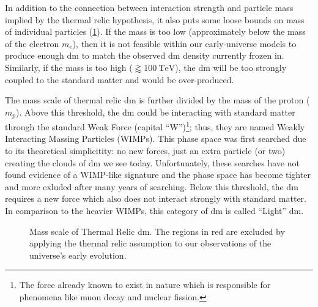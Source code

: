 In addition to the connection between interaction strength and particle mass implied by the thermal
relic hypothesis, it also puts some loose bounds on mass of individual particles
(\cref{fig:dm-mass-scale}). If the mass is too low (approximately below the mass of the electron
$m_e$), then it is not feasible within our early-universe models to produce enough \gls{dm} to
match the observed \gls{dm} density currently frozen in. Similarly, if the mass is too high
($\gtrapprox 100~\text{TeV}$), the \gls{dm} will be too strongly coupled to the standard matter and
would be over-produced. 

The mass scale of thermal relic \gls{dm} is further divided by the mass of the proton ($m_p$).
Above this threshold, the \gls{dm} could be interacting with standard matter through the standard
Weak Force (capital ``W'')\footnote{ The force already known to exist in nature which is
  responsible for phenomena like muon decay and nuclear fission. }; thus, they are named Weakly
Interacting Massing Particles (WIMPs). This phase space was first searched due to its theoretical
simplicitity: no new forces, just an extra particle (or two) creating the clouds of \gls{dm} we see
today. Unfortunately, these searches have not found evidence of a WIMP-like
signature\cite{supercdms-2018,damic-2020,xenon1t-2018} and the phase space has become tighter and
more exluded after many years of searching. Below this threshold, the \gls{dm} requires a new force
which also does not interact strongly with standard matter. In comparison to the heavier WIMPs,
this category of \gls{dm} is called ``Light'' \gls{dm}.

\begin{figure}
  \centering
  
  \caption{Mass scale of Thermal Relic \gls{dm}.
    The regions in red are excluded by applying the thermal relic assumption
    to our observations of the universe's early evolution.}
  \label{fig:dm-mass-scale}
\end{figure}

